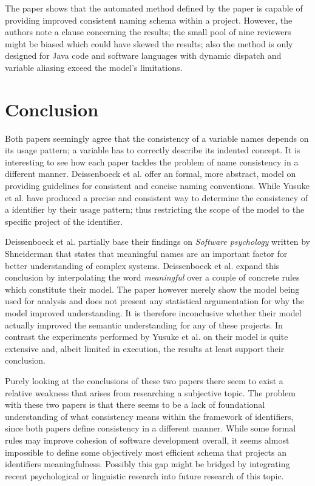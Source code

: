 \documentclass[a4paper,12pt]{article}
\begin{document}
\begin{multicols}{2}
The paper shows that the automated method defined by the paper is capable of providing improved consistent naming schema within a project. However, the authors note a clause concerning the results; the small pool of nine reviewers might be biased which could have skewed the results; also the method is only designed for Java code and software languages with dynamic dispatch and variable aliasing exceed the model's limitations.

\section*{Conclusion}
Both papers seemingly agree that the consistency of a variable names depends on its usage pattern; a variable has to correctly describe its indented concept. It is interesting to see how each paper tackles the problem of name consistency in a different manner. Deissenboeck et al. offer an formal, more abstract, model on providing guidelines for consistent and concise naming conventions.\cite{deisenbock_concise_2005} While Yusuke et al. have produced a precise and consistent way to determine the consistency of a identifier by their usage pattern; thus restricting the scope of the model to the specific project of the identifier.\cite{shinyama_improving_2021}

Deissenboeck et al. partially base their findings on \textit{Software psychology} written by Shneiderman that states that meaningful names are an important factor for better understanding of complex systems.\cite{schneiderman_software_1980} Deissenboeck et al. expand this conclusion by interpolating the word \textit{meaningful} over a couple of concrete rules which constitute their model.\cite{deisenbock_concise_2005} The paper however merely show the model being used for analysis and does not present any statistical argumentation for why the model improved understanding. It is therefore inconclusive whether their model actually improved the semantic understanding for any of these projects. In contrast the experiments performed by Yusuke et al. on their model is quite extensive and, albeit limited in execution, the results at least support their conclusion. 

Purely looking at the conclusions of these two papers there seem to exist a relative weakness that arises from researching a subjective topic. The problem with these two papers is that there seems to be a lack of foundational understanding of what consistency means within the framework of identifiers, since both papers define consistency in a different manner. While some formal rules may improve cohesion of software development overall, it seems almost impossible to define some objectively most efficient schema that projects an identifiers meaningfulness. Possibly this gap might be bridged by integrating recent psychological or linguistic research into future research of this topic.



\end{multicols}
\end{document}
